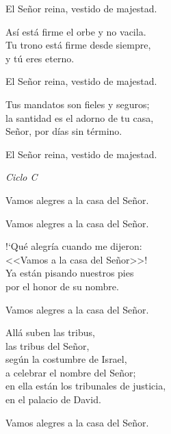 \documentclass[12pt, letterpaper]{report}
\begin{document}
    \noindent
    El Se\~nor reina, vestido de majestad.

    \noindent
    As\'i est\'a firme el orbe y no vacila.\\
    Tu trono est\'a firme desde siempre,\\
    y t\'u eres eterno.

    \noindent
    El Se\~nor reina, vestido de majestad.

    \noindent
    Tus mandatos son fieles y seguros;\\
    la santidad es el adorno de tu casa,\\
    Se\~nor, por d\'ias sin t\'ermino.

    \noindent
    El Se\~nor reina, vestido de majestad.
    \clearpage



    \LARGE \textit{Ciclo C}

    \noindent
    \LARGE Vamos alegres a la casa del Se\~nor.

    \noindent
    Vamos alegres a la casa del Se\~nor.

    \noindent
    !`Qu\'e alegr\'ia cuando me dijeron:\\
    <<Vamos a la casa del Se\~nor>>!\\
    Ya est\'an pisando nuestros pies\\
    por el honor de su nombre.

    \noindent
    Vamos alegres a la casa del Se\~nor.

    \noindent
    All\'a suben las tribus,\\
    las tribus del Se\~nor,\\
    seg\'un la costumbre de Israel,\\
    a celebrar el nombre del Se\~nor;\\
    en ella est\'an los tribunales de justicia,\\
    en el palacio de David.

    \noindent
    Vamos alegres a la casa del Se\~nor.
    \clearpage

\end{document}
